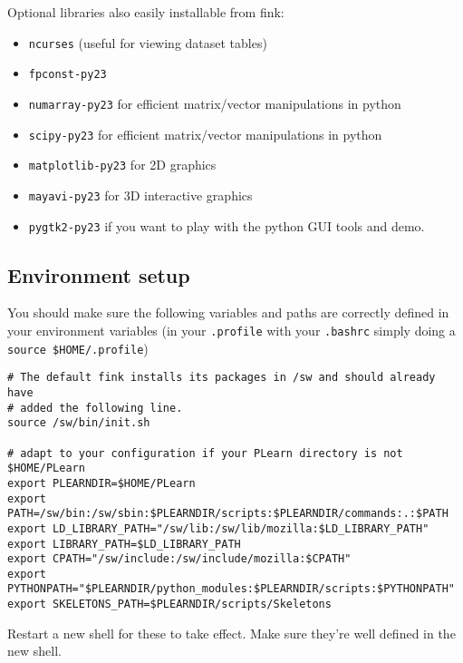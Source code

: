 \documentclass[11pt]{book}
\begin{document}
Optional libraries also easily installable from fink:
\begin{itemize}
\item {\tt ncurses}  (useful for viewing dataset tables)
\item {\tt fpconst-py23}
\item {\tt numarray-py23} for efficient matrix/vector manipulations in python
\item {\tt scipy-py23} for efficient matrix/vector manipulations in python
\item {\tt matplotlib-py23} for 2D graphics
\item {\tt mayavi-py23} for 3D interactive graphics
\item {\tt pygtk2-py23} if you want to play with the
  python GUI tools and demo.
\end{itemize}


\subsection{Environment setup}

You should make sure the following variables and paths are correctly defined in your
environment variables (in your {\tt .profile} with your {\tt .bashrc}
simply doing a \verb!source $HOME/.profile!)

\begin{verbatim}
# The default fink installs its packages in /sw and should already have
# added the following line.
source /sw/bin/init.sh

# adapt to your configuration if your PLearn directory is not $HOME/PLearn
export PLEARNDIR=$HOME/PLearn
export PATH=/sw/bin:/sw/sbin:$PLEARNDIR/scripts:$PLEARNDIR/commands:.:$PATH
export LD_LIBRARY_PATH="/sw/lib:/sw/lib/mozilla:$LD_LIBRARY_PATH"
export LIBRARY_PATH=$LD_LIBRARY_PATH
export CPATH="/sw/include:/sw/include/mozilla:$CPATH"
export PYTHONPATH="$PLEARNDIR/python_modules:$PLEARNDIR/scripts:$PYTHONPATH"
export SKELETONS_PATH=$PLEARNDIR/scripts/Skeletons
\end{verbatim}

Restart a new shell for these to take effect. Make sure they're well
defined in the new shell.
\end{document}
